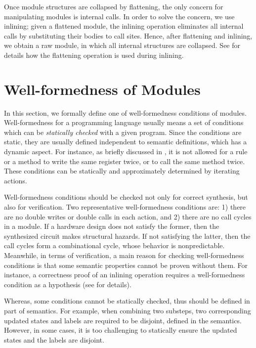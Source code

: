 Once module structures are collapsed by flattening, the only concern
for manipulating modules is internal calls. In order to solve the
concern, we use inlining; given a flattened module, the inlining
operation eliminates all internal calls by substituting their bodies
to call sites. Hence, after flattening and inlining, we obtain a raw
module, in which all internal structures are collapsed. See
 for details how the flattening operation is
used during inlining.

\section{Well-formedness of Modules}
\label{sec-wf}

In this section, we formally define one of well-formedness conditions
of modules. Well-formedness for a programming language usually means a
set of conditions which can be \emph{statically checked} with a given
program. Since the conditions are static, they are usually defined
independent to semantic definitions, which has a dynamic aspect.  For
instance, as briefly discussed in , it
is not allowed for a rule or a method to write the same register
twice, or to call the same method twice. These conditions can be
statically and approximately determined by iterating actions.

Well-formedness conditions should be checked not only for correct
synthesis, but also for verification. Two representative
well-formedness conditions are: 1) there are no double writes or
double calls in each action, and 2) there are no call cycles in a
module. If a hardware design does not satisfy the former, then the
synthesized circuit makes structural hazards. If not satisfying the
latter, then the call cycles form a combinational cycle, whose
behavior is nonpredictable. Meanwhile, in terms of verification, a
main reason for checking well-formedness conditions is that some
semantic properties cannot be proven without them. For instance, a
correctness proof of an inlining operation requires a well-formedness
condition as a hypothesis (see  for
details).

Whereas, some conditions cannot be statically checked, thus should be
defined in part of semantics. For example, when combining two
substeps, two corresponding updated states and labels are required to
be disjoint, defined in the \Substeps{} semantics. However, in some
cases, it is too challenging to statically ensure the updated states
and the labels are disjoint.

